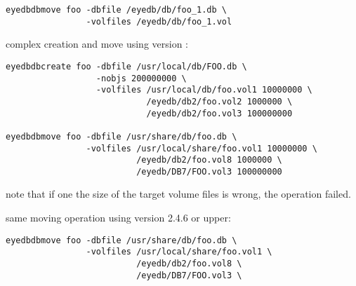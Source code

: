 \begin{verbatim}
eyedbdbmove foo -dbfile /eyedb/db/foo_1.db \
                -volfiles /eyedb/db/foo_1.vol
\end{verbatim}
\normalsize
\item complex creation and move using version \eyedbversion:
\verbsize
\begin{verbatim}
eyedbdbcreate foo -dbfile /usr/local/db/FOO.db \
                  -nobjs 200000000 \
                  -volfiles /usr/local/db/foo.vol1 10000000 \
                            /eyedb/db2/foo.vol2 1000000 \
                            /eyedb/db2/foo.vol3 100000000

eyedbdbmove foo -dbfile /usr/share/db/foo.db \
                -volfiles /usr/local/share/foo.vol1 10000000 \
                          /eyedb/db2/foo.vol8 1000000 \
                          /eyedb/DB7/FOO.vol3 100000000
\end{verbatim}
\normalsize
note that if one the size of the target volume files is wrong, the
operation failed.
\item same moving operation using version 2.4.6 or upper:
\verbsize
\begin{verbatim}
eyedbdbmove foo -dbfile /usr/share/db/foo.db \
                -volfiles /usr/local/share/foo.vol1 \
                          /eyedb/db2/foo.vol8 \
                          /eyedb/DB7/FOO.vol3 \
\end{verbatim}
\normalsize
\ei
